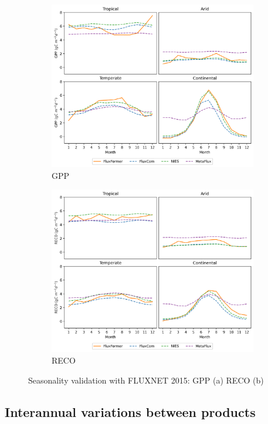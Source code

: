 \begin{figure}[p]
    \centering
    \begin{subfigure}{\textwidth}
      \centering
      \includegraphics[width=.8\textwidth]{figs/chap6/seasonal_inter_prods_GPP.png}
      \caption{GPP}
      \label{fig:chap6_fig6a}
    \end{subfigure}

    \begin{subfigure}{\textwidth}
      \centering
      \includegraphics[width=.8\textwidth]{figs/chap6/seasonal_inter_prods_RECO.png}
      \caption{RECO}
      \label{fig:chap6_fig6b}
    \end{subfigure}
    \caption[Seasonality validation with FLUXNET 2015]{Seasonality validation with FLUXNET 2015: GPP (a) RECO (b)}
    \label{fig:chap6_fig6}
\end{figure}

\subsection{Interannual variations between products}

